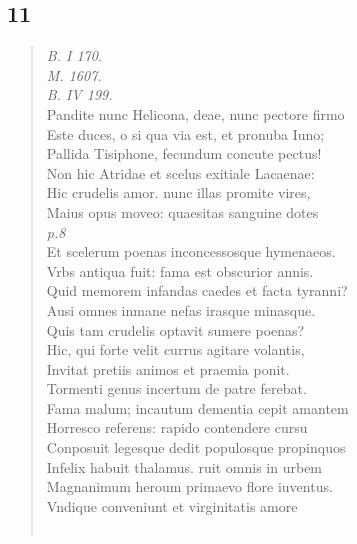 \documentclass[11pt, a4paper]{report}
\begin{document}
            \subsection*{11}
      \begin{verse}
      \textit{B. I 170.} \\ \textit{M. 1607.} \\ \textit{B. IV 199.} \\ Pandite nunc Helicona, deae, nunc pectore firmo \\ Este duces, o si qua via est, et pronuba Iuno; \\ Pallida Tisiphone, fecundum concute pectus! \\ Non hic Atridae et scelus exitiale Lacaenae: \\ Hic crudelis amor. nunc illas promite vires, \\ Maius opus moveo: quaesitas sanguine dotes \\ \textit{p.8} \\ Et scelerum poenas inconcessosque hymenaeos. \\ Vrbs antiqua fuit: fama est obscurior annis. \\ Quid memorem infandas caedes et facta tyranni? \\ Ausi omnes inmane nefas irasque minasque. \\ Quis tam crudelis optavit sumere poenas? \\ Hic, qui forte velit currus agitare volantis, \\ Invitat pretiis animos et praemia ponit. \\ Tormenti genus incertum de patre ferebat. \\ Fama malum; incautum dementia cepit amantem \\ Horresco referens: rapido contendere cursu \\ Conposuit legesque dedit populosque propinquos \\ Infelix habuit thalamus. ruit omnis in urbem \\ Magnanimum heroum primaevo flore iuventus. \\ Vndique conveniunt et virginitatis amore \\ 
        ﻿\pagebreak 

\end{verse}
\end{document}
